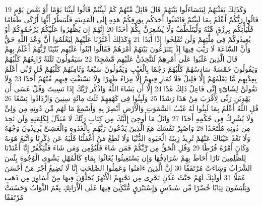 \documentclass[20pt,a4paper]{article}
\begin{document}
{\tiny\colorbox{cl_aya}{19}} وَكَذَلِكَ بَعَثْنَهُمْ لِيَتَسَاءَلُوا بَيْنَهُمْ قَالَ قَائِلٌ مِّنْهُمْ كَمْ لَبِثْتُمْ قَالُوا لَبِثْنَا يَوْمًا أَوْ بَعْضَ يَوْمٍ قَالُوا رَبُّكُمْ أَعْلَمُ بِمَا لَبِثْتُمْ فَابْعَثُوا أَحَدَكُم بِوَرِقِكُمْ هَذِهِ إِلَى الْمَدِينَةِ فَلْيَنظُرْ أَيُّهَا أَزْكَى طَعَامًا فَلْيَأْتِكُم بِرِزْقٍ مِّنْهُ وَلْيَتَلَطَّفْ وَلَا يُشْعِرَنَّ بِكُمْ أَحَدًا
{\tiny\colorbox{cl_aya}{20}} إِنَّهُمْ إِن يَظْهَرُوا عَلَيْكُمْ يَرْجُمُوكُمْ أَوْ يُعِيدُوكُمْ فِى مِلَّتِهِمْ وَلَن تُفْلِحُوا إِذًا أَبَدًا
{\tiny\colorbox{cl_aya}{21}} وَكَذَلِكَ أَعْثَرْنَا عَلَيْهِمْ لِيَعْلَمُوا أَنَّ وَعْدَ اللَّهِ حَقٌّ وَأَنَّ السَّاعَةَ لَا رَيْبَ فِيهَا إِذْ يَتَنَزَعُونَ بَيْنَهُمْ أَمْرَهُمْ فَقَالُوا ابْنُوا عَلَيْهِم بُنْيَنًا رَّبُّهُمْ أَعْلَمُ بِهِمْ قَالَ الَّذِينَ غَلَبُوا عَلَى أَمْرِهِمْ لَنَتَّخِذَنَّ عَلَيْهِم مَّسْجِدًا
{\tiny\colorbox{cl_aya}{22}} سَيَقُولُونَ ثَلَثَةٌ رَّابِعُهُمْ كَلْبُهُمْ وَيَقُولُونَ خَمْسَةٌ سَادِسُهُمْ كَلْبُهُمْ رَجْمًا بِالْغَيْبِ وَيَقُولُونَ سَبْعَةٌ وَثَامِنُهُمْ كَلْبُهُمْ قُل رَّبِّى أَعْلَمُ بِعِدَّتِهِم مَّا يَعْلَمُهُمْ إِلَّا قَلِيلٌ فَلَا تُمَارِ فِيهِمْ إِلَّا مِرَاءً ظَهِرًا وَلَا تَسْتَفْتِ فِيهِم مِّنْهُمْ أَحَدًا
{\tiny\colorbox{cl_aya}{23}} وَلَا تَقُولَنَّ لِشَاىْءٍ إِنِّى فَاعِلٌ ذَلِكَ غَدًا
{\tiny\colorbox{cl_aya}{24}} إِلَّا أَن يَشَاءَ اللَّهُ وَاذْكُر رَّبَّكَ إِذَا نَسِيتَ وَقُلْ عَسَى أَن يَهْدِيَنِ رَبِّى لِأَقْرَبَ مِنْ هَذَا رَشَدًا
{\tiny\colorbox{cl_aya}{25}} وَلَبِثُوا فِى كَهْفِهِمْ ثَلَثَ مِائَةٍ سِنِينَ وَازْدَادُوا تِسْعًا
{\tiny\colorbox{cl_aya}{26}} قُلِ اللَّهُ أَعْلَمُ بِمَا لَبِثُوا لَهُ غَيْبُ السَّمَوَتِ وَالْأَرْضِ أَبْصِرْ بِهِ وَأَسْمِعْ مَا لَهُم مِّن دُونِهِ مِن وَلِىٍّ وَلَا يُشْرِكُ فِى حُكْمِهِ أَحَدًا
{\tiny\colorbox{cl_aya}{27}} وَاتْلُ مَا أُوحِىَ إِلَيْكَ مِن كِتَابِ رَبِّكَ لَا مُبَدِّلَ لِكَلِمَتِهِ وَلَن تَجِدَ مِن دُونِهِ مُلْتَحَدًا
{\tiny\colorbox{cl_aya}{28}} وَاصْبِرْ نَفْسَكَ مَعَ الَّذِينَ يَدْعُونَ رَبَّهُم بِالْغَدَوةِ وَالْعَشِىِّ يُرِيدُونَ وَجْهَهُ وَلَا تَعْدُ عَيْنَاكَ عَنْهُمْ تُرِيدُ زِينَةَ الْحَيَوةِ الدُّنْيَا وَلَا تُطِعْ مَنْ أَغْفَلْنَا قَلْبَهُ عَن ذِكْرِنَا وَاتَّبَعَ هَوَىهُ وَكَانَ أَمْرُهُ فُرُطًا
{\tiny\colorbox{cl_aya}{29}} وَقُلِ الْحَقُّ مِن رَّبِّكُمْ فَمَن شَاءَ فَلْيُؤْمِن وَمَن شَاءَ فَلْيَكْفُرْ إِنَّا أَعْتَدْنَا لِلظَّلِمِينَ نَارًا أَحَاطَ بِهِمْ سُرَادِقُهَا وَإِن يَسْتَغِيثُوا يُغَاثُوا بِمَاءٍ كَالْمُهْلِ يَشْوِى الْوُجُوهَ بِئْسَ الشَّرَابُ وَسَاءَتْ مُرْتَفَقًا
{\tiny\colorbox{cl_aya}{30}} إِنَّ الَّذِينَ ءَامَنُوا وَعَمِلُوا الصَّلِحَتِ إِنَّا لَا نُضِيعُ أَجْرَ مَنْ أَحْسَنَ عَمَلًا
{\tiny\colorbox{cl_aya}{31}} أُولَئِكَ لَهُمْ جَنَّتُ عَدْنٍ تَجْرِى مِن تَحْتِهِمُ الْأَنْهَرُ يُحَلَّوْنَ فِيهَا مِنْ أَسَاوِرَ مِن ذَهَبٍ وَيَلْبَسُونَ ثِيَابًا خُضْرًا مِّن سُندُسٍ وَإِسْتَبْرَقٍ مُّتَّكِِٔينَ فِيهَا عَلَى الْأَرَائِكِ نِعْمَ الثَّوَابُ وَحَسُنَتْ مُرْتَفَقًا
\end{document}
